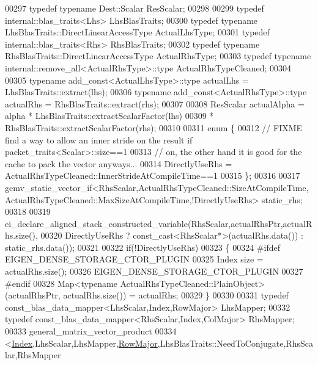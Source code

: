 \begin{DoxyCode}
00297     \textcolor{keyword}{typedef} \textcolor{keyword}{typename} Dest::Scalar  ResScalar;
00298     
00299     \textcolor{keyword}{typedef} internal::blas\_traits<Lhs> LhsBlasTraits;
00300     \textcolor{keyword}{typedef} \textcolor{keyword}{typename} LhsBlasTraits::DirectLinearAccessType ActualLhsType;
00301     \textcolor{keyword}{typedef} internal::blas\_traits<Rhs> RhsBlasTraits;
00302     \textcolor{keyword}{typedef} \textcolor{keyword}{typename} RhsBlasTraits::DirectLinearAccessType ActualRhsType;
00303     \textcolor{keyword}{typedef} \textcolor{keyword}{typename} internal::remove\_all<ActualRhsType>::type ActualRhsTypeCleaned;
00304 
00305     \textcolor{keyword}{typename} add\_const<ActualLhsType>::type actualLhs = LhsBlasTraits::extract(lhs);
00306     \textcolor{keyword}{typename} add\_const<ActualRhsType>::type actualRhs = RhsBlasTraits::extract(rhs);
00307 
00308     ResScalar actualAlpha = alpha * LhsBlasTraits::extractScalarFactor(lhs)
00309                                   * RhsBlasTraits::extractScalarFactor(rhs);
00310 
00311     \textcolor{keyword}{enum} \{
00312       \textcolor{comment}{// FIXME find a way to allow an inner stride on the result if packet\_traits<Scalar>::size==1}
00313       \textcolor{comment}{// on, the other hand it is good for the cache to pack the vector anyways...}
00314       DirectlyUseRhs = ActualRhsTypeCleaned::InnerStrideAtCompileTime==1
00315     \};
00316 
00317     
      gemv\_static\_vector\_if<RhsScalar,ActualRhsTypeCleaned::SizeAtCompileTime,ActualRhsTypeCleaned::MaxSizeAtCompileTime,!DirectlyUseRhs> static\_rhs;
00318 
00319     ei\_declare\_aligned\_stack\_constructed\_variable(RhsScalar,actualRhsPtr,actualRhs.size(),
00320         DirectlyUseRhs ? \textcolor{keyword}{const\_cast<}RhsScalar*\textcolor{keyword}{>}(actualRhs.data()) : static\_rhs.data());
00321 
00322     \textcolor{keywordflow}{if}(!DirectlyUseRhs)
00323     \{
00324 \textcolor{preprocessor}{      #ifdef EIGEN\_DENSE\_STORAGE\_CTOR\_PLUGIN}
00325       Index size = actualRhs.size();
00326       EIGEN\_DENSE\_STORAGE\_CTOR\_PLUGIN
00327 \textcolor{preprocessor}{      #endif}
00328       Map<typename ActualRhsTypeCleaned::PlainObject>(actualRhsPtr, actualRhs.size()) = actualRhs;
00329     \}
00330 
00331     \textcolor{keyword}{typedef} const\_blas\_data\_mapper<LhsScalar,Index,RowMajor> LhsMapper;
00332     \textcolor{keyword}{typedef} const\_blas\_data\_mapper<RhsScalar,Index,ColMajor> RhsMapper;
00333     general\_matrix\_vector\_product
00334         <\hyperlink{namespace_eigen_a62e77e0933482dafde8fe197d9a2cfde}{Index},LhsScalar,LhsMapper,\hyperlink{group__enums_ggaacded1a18ae58b0f554751f6cdf9eb13acfcde9cd8677c5f7caf6bd603666aae3}{RowMajor},LhsBlasTraits::NeedToConjugate,RhsScalar,RhsMapper

\end{DoxyCode}
